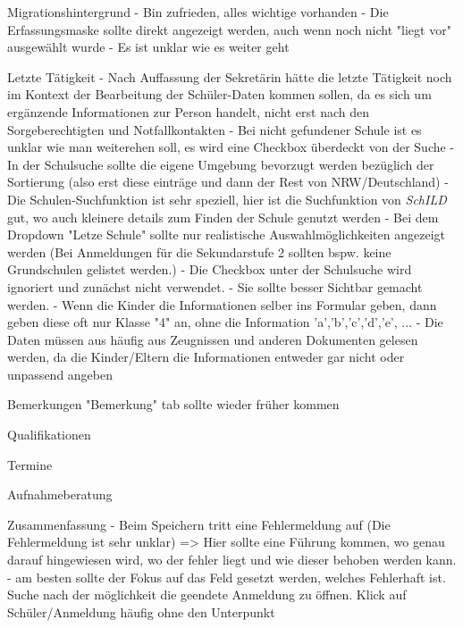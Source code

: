 Migrationshintergrund
- Bin zufrieden, alles wichtige vorhanden
- Die Erfassungsmaske sollte direkt angezeigt werden, auch wenn noch nicht "liegt vor" ausgewählt wurde
- Es ist unklar wie es weiter geht













Letzte Tätigkeit
- Nach Auffassung der Sekretärin hätte die letzte Tätigkeit noch im Kontext der Bearbeitung der Schüler-Daten kommen sollen, da es sich um ergänzende Informationen zur Person handelt, nicht erst nach den Sorgeberechtigten und Notfallkontakten
- Bei nicht gefundener Schule ist es unklar wie man weiterehen soll, es wird eine Checkbox überdeckt von der Suche
- In der Schulsuche sollte die eigene Umgebung bevorzugt werden bezüglich der Sortierung (also erst diese einträge und dann der Rest von NRW/Deutschland)
- Die Schulen-Suchfunktion ist sehr speziell, hier ist die Suchfunktion von \textit{SchILD} gut, wo auch kleinere details zum Finden der Schule genutzt werden
- Bei dem Dropdown "Letze Schule" sollte nur realistische Auswahlmöglichkeiten angezeigt werden (Bei Anmeldungen für die Sekundarstufe 2 sollten bspw. keine Grundschulen gelistet werden.)
- Die Checkbox unter der Schulsuche wird ignoriert und zunächst nicht verwendet.
    - Sie sollte besser Sichtbar gemacht werden.
- Wenn die Kinder die Informationen selber ins Formular geben, dann geben diese oft nur Klasse "4" an, ohne die Information 'a','b','c','d','e', ...
- Die Daten müssen aus häufig aus Zeugnissen und anderen Dokumenten gelesen werden, da die Kinder/Eltern die Informationen entweder gar nicht oder unpassend angeben	

Bemerkungen
"Bemerkung" tab sollte wieder früher kommen 
 
Qualifikationen		

Termine		

Aufnahmeberatung		

Zusammenfassung	
- Beim Speichern tritt eine Fehlermeldung auf (Die Fehlermeldung ist sehr unklar) => Hier sollte eine Führung kommen, wo genau darauf hingewiesen wird, wo der fehler liegt und wie dieser behoben werden kann.
- am besten sollte der Fokus auf das Feld gesetzt werden, welches Fehlerhaft ist.
Suche nach der möglichkeit die geendete Anmeldung zu öffnen. Klick auf Schüler/Anmeldung häufig ohne den Unterpunkt


